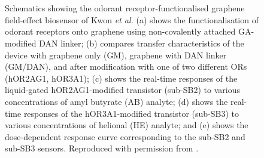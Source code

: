 \documentclass[
  a4paper,
]{scrbook}
\begin{document}
\begin{figure}
\begin{minipage}[t]{0.03\linewidth}
{{}

}

\end{minipage}%
%
\begin{minipage}[t]{0.01\linewidth}

{\centering 

~

}

\end{minipage}%
%
\begin{minipage}[t]{0.45\linewidth}

{\centering 


}

\end{minipage}%
%
\begin{minipage}[t]{0.01\linewidth}

{\centering 

~

}

\end{minipage}%

\caption[Schematics showing the odorant receptor-functionalised graphene
field-effect biosensor of Kwon \emph{et
al.}]{\label{fig-kwon-multiplexed}Schematics showing the odorant
receptor-functionalised graphene field-effect biosensor of Kwon \emph{et
al.} (a) shows the functionalisation of odorant receptors onto graphene
using non-covalently attached GA-modified DAN linker; (b) compares
transfer characteristics of the device with graphene only (GM), graphene
with DAN linker (GM/DAN), and after modification with one of two
different ORs (hOR2AG1, hOR3A1); (c) shows the real-time responses of
the liquid-gated hOR2AG1-modified transistor (sub-SB2) to various
concentrations of amyl butyrate (AB) analyte; (d) shows the real-time
responses of the hOR3A1-modified transistor (sub-SB3) to various
concentrations of helional (HE) analyte; and (e) shows the
dose-dependent response curve corresponding to the sub-SB2 and sub-SB3
sensors. Reproduced with permission from \autocite{Kwon2015}.}

\end{figure}
\end{document}
